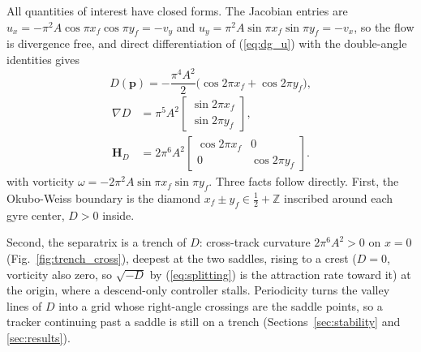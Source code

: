 \documentclass[lettersize,journal]{IEEEtran}
\begin{document}
All quantities of interest have closed forms. The Jacobian entries are
$u_x = -\pi^2 A \cos\pi x_f \cos\pi y_f = -v_y$ and
$u_y = \pi^2 A \sin\pi x_f \sin\pi y_f = -v_x$, so the flow is divergence
free, and direct differentiation of (\ref{eq:dg_u}) with the double-angle
identities gives
\begin{equation}
    D(\mathbf{p}) = -\frac{\pi^4 A^2}{2}
    \bigl(\cos 2\pi x_f + \cos 2\pi y_f\bigr),
    \label{eq:det_analytic_main}
\end{equation}
\begin{equation}
    \begin{aligned}
    \nabla D &= \pi^5 A^2
    \begin{bmatrix} \sin 2\pi x_f \\ \sin 2\pi y_f \end{bmatrix},
    \\
    \mathbf{H}_D &= 2\pi^6 A^2
    \begin{bmatrix} \cos 2\pi x_f & 0 \\ 0 & \cos 2\pi y_f \end{bmatrix}.
    \end{aligned}
    \label{eq:gradhess_analytic_main}
\end{equation}
with vorticity $\omega = -2\pi^2 A \sin\pi x_f \sin\pi y_f$. Three facts
follow directly. First, the Okubo-Weiss boundary is the diamond
$x_f \pm y_f \in \tfrac{1}{2} + \mathbb{Z}$ inscribed around each gyre
center, $D > 0$ inside.

Second, the separatrix is a trench of $D$: cross-track curvature
$2\pi^6 A^2 > 0$ on $x = 0$ (Fig.~\ref{fig:trench_cross}), deepest at
the two saddles, rising to a crest ($D = 0$, vorticity also zero, so
$\sqrt{-D}$ by (\ref{eq:splitting}) is the attraction rate toward it)
at the origin, where a descend-only controller stalls. Periodicity
turns the valley lines of $D$ into a grid whose right-angle crossings
are the saddle points, so a tracker continuing past a saddle is still
on a trench (Sections~\ref{sec:stability} and \ref{sec:results}).
\end{document}
